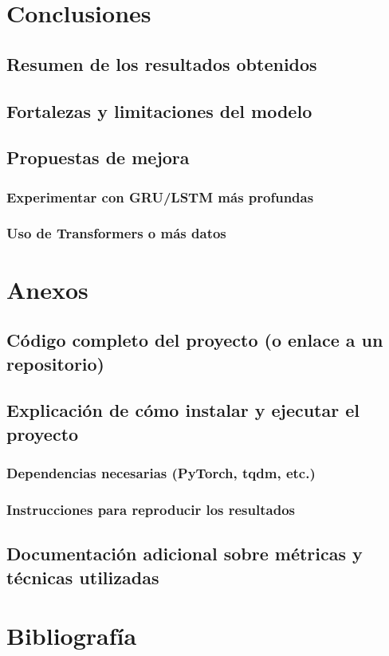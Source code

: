 \documentclass{article}
\begin{document}
\section{Conclusiones}
\subsection{Resumen de los resultados obtenidos}
\subsection{Fortalezas y limitaciones del modelo}
\subsection{Propuestas de mejora}
\subsubsection{Experimentar con GRU/LSTM más profundas}
\subsubsection{Uso de Transformers o más datos}

\section{Anexos}
\subsection{Código completo del proyecto (o enlace a un repositorio)}
\subsection{Explicación de cómo instalar y ejecutar el proyecto}
\subsubsection{Dependencias necesarias (PyTorch, tqdm, etc.)}
\subsubsection{Instrucciones para reproducir los resultados}
\subsection{Documentación adicional sobre métricas y técnicas utilizadas}

\newpage

\section{Bibliografía}
\nocite{*}
\printbibliography
\end{document}
